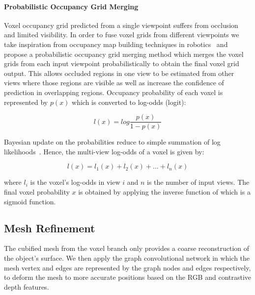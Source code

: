 \paragraph{Probabilistic Occupancy Grid Merging}\vspace{-4mm}
Voxel occupancy grid predicted from a single viewpoint suffers from occlusion and limited visibility.
In order to fuse voxel grids from different viewpoints we take inspiration from occupancy map building techniques in robotics~\cite{grisetti2007improved,konolige1997improved} and propose a probabilistic occupancy grid merging method which merges the voxel grids from each input viewpoint probabilistically to obtain the final voxel grid output.
This allows occluded regions in one view to be estimated from other views where those regions are visible as well as increase the confidence of prediction in overlapping regions.
Occupancy probability of each voxel is represented by $p(x)$ which is converted to log-odds (logit):

\begin{equation}
    l(x) = log \frac{p(x)}{1 - p(x)}
    \label{equ:logodds}
\end{equation}

Bayesian update on the probabilities reduce to simple summation of log likelihoods~\cite{konolige1997improved}. Hence, the multi-view log-odds of a voxel is given by:

\begin{equation}
    l(x) = l_1(x) + l_2(x) + ... + l_n(x)
    \label{equ:logodds_sum}
\end{equation}

\noindent where $l_i$ is the voxel's log-odds in view $i$ and $n$ is the number of input views.
The final voxel probability $x$ is obtained by applying the inverse function of  which is a sigmoid function.

\subsection{Mesh Refinement}
\label{subsec:mesh_refinement}
The cubified mesh from the voxel branch only provides a coarse reconstruction of the object's surface. 
We then apply the graph convolutional network in which the mesh vertex and edges are represented by the graph nodes and edges respectively, to deform the mesh to more accurate positions based on the RGB and contrastive depth features.

